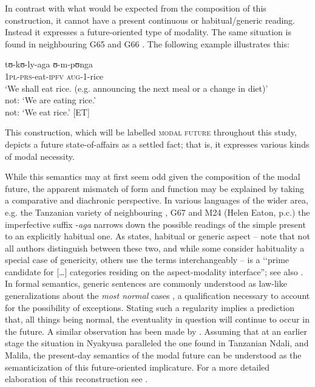 In contrast with what would be expected from the composition of this construction, it cannot have a present continuous or habitual/generic reading. Instead it expresses a future-oriented type of modality. The same situation is found in neighbouring  G65 and  G66 \citep{EatonHToAppear}. The following example illustrates this:

\begin{exe}
\ex \label{exCOMMEinstiegsbeispiel}
\gll tʊ-kʊ-ly-aga ʊ-m-pʊnga\\
\textsc{1pl}-\textsc{prs}-eat-\textsc{ipfv} \textsc{aug}-1-rice\\
\glt `We shall eat rice. (e.g. announcing the next meal or a change in diet)'\\
not: `We are eating rice.'\\
not: `We eat rice.' [ET]
\end{exe}

This construction, which will be labelled \textsc{modal future} throughout this study, depicts a future state-of-affairs as a settled fact; that is, it expresses various kinds of modal necessity.

While this semantics may at first seem odd given the composition of the modal future, the apparent mismatch of form and function may be explained by taking a comparative and diachronic perspective. In various languages of the wider area, e.g. the Tanzanian variety of neighbouring  \citep{SwillaI1998},  G67 \citep{GrayMS} and  M24 (Helen Eaton, p.c.) the imperfective suffix \mbox{-\textit{aga}} narrows down the possible readings of the simple present to an explicitly habitual one. As \citet[21]{ZiegelerD2006} states, habitual or generic aspect -- note that not all authors distinguish between these two, and while some consider habituality a special case of genericity, others use the terms interchangeably -- is a \lq\lq prime candidate for [\ldots] categories residing on the aspect-modality interface''; see also \citet{GivonT1994}. In formal semantics, generic sentences are commonly understood as law-like generalizations about the \textit{most normal} cases \citep{KrifkaMetal1995}, a qualification necessary to account for the possibility of exceptions. Stating such a regularity implies a prediction that, all things being normal, the eventuality in question will continue to occur in the future. A similar observation has been made by \citet[140f]{BrintonL1988}. Assuming that at an earlier stage the situation in Nyakyusa paralleled the one found in Tanzanian Ndali,  and Malila, the present-day semantics of the modal future can be understood as the semanticization of this future-oriented implicature. For a more detailed elaboration of this reconstruction see \citet{PersohnB2016}.

